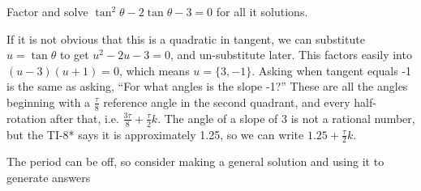 \begin{example}
	\exProblem
Factor and solve $\tan^2\theta - 2\tan\theta - 3 = 0$ for all it solutions.

	\exSolution
If it is not obvious that this is a quadratic in tangent, we can substitute $u = \tan\theta$ to
get $u^2 - 2u - 3 = 0$, and un-substitute later.  This factors easily into $(u-3)(u+1)=0$, which
means $u = \{3, -1\}$.  Asking when tangent equals -1 is the same as asking, ``For what
angles is the slope -1?''  These are all the angles beginning with a $\frac{\tau}{8}$ reference
angle in the second quadrant, and every half-rotation after that, i.e. $\frac{3\tau}{8}+\frac{\tau}{2}k$.
The angle of a slope of 3 is not a rational number, but the TI-8* says it is approximately
1.25, so we can write $1.25 + \frac{\tau}{2}k$.
\end{example}


The period can be off, so consider making a general solution and using it to generate answers
